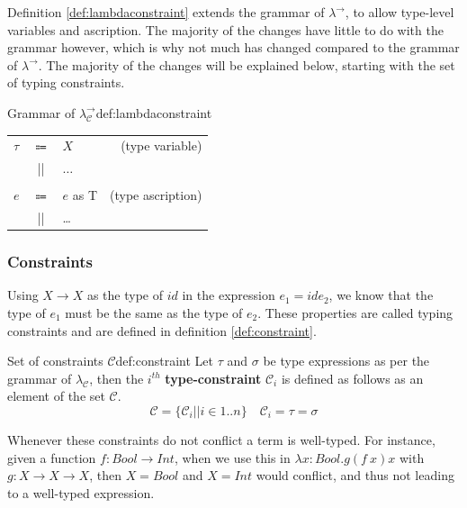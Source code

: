 Definition \ref{def:lambdaconstraint} extends the grammar of $\lambda^\rightarrow$, to allow type-level variables and ascription.
The majority of the changes have little to do with the grammar however, which is why not much has changed compared to the grammar of $\lambda^\rightarrow$.
The majority of the changes will be explained below, starting with the set of typing constraints.

\begin{definitiontitled}{Grammar of $\lambda_\mathcal{C}^\rightarrow$}{def:lambdaconstraint}
\begin{tabular}{lclr}
$\tau$  & $\Coloneqq$ & $X$             & (type variable) \\
        & ||     & $\ldots$              & \\
\\
$e$     & $\Coloneqq$ & $e$ as T        & (type ascription) \\
        & ||           & \ldots          & \\
\end{tabular}
\end{definitiontitled}

\subsubsection{Constraints}
Using $X \rightarrow X$ as the type of $id$ in the expression $e_1 = id e_2$, we know that the type of $e_1$ must be the same as the type of $e_2$.
These properties are called typing constraints and are defined in definition \ref{def:constraint}.

\begin{definitiontitled}{Set of constraints $\mathcal{C}$}{def:constraint}
Let $\tau$ and $\sigma$ be type expressions as per the grammar of $\lambda_\mathcal{C}$, then the $i^{th}$ \textbf{type-constraint} $\mathcal{C}_i$ is defined as follows as an element of the set $\mathcal{C}$.
\[
\mathcal{C}= \{\mathcal{C}_i || i \in 1..n\} \quad
\mathcal{C}_i = \tau = \sigma
\]
\end{definitiontitled}

Whenever these constraints do not conflict a term is well-typed.
For instance, given a function $f : \textit{Bool} \rightarrow \textit{Int}$, when we use this in $\lambda x:\textit{Bool}. g (f \: x) x$ with $g : X \rightarrow X \rightarrow X$, then $X = \textit{Bool}$ and $X = \textit{Int}$ would conflict, and thus not leading to a well-typed expression.

